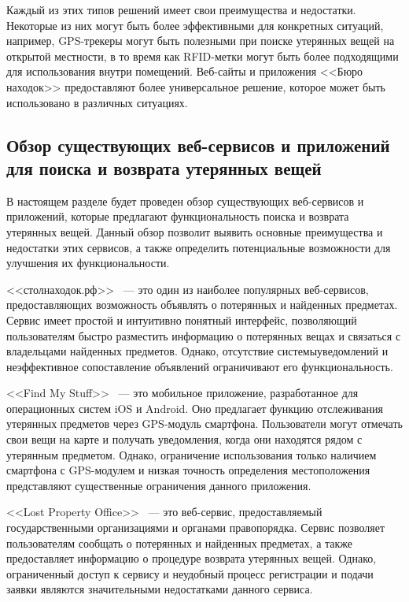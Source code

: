 \documentclass{mirea}
\begin{document}
Каждый из этих типов решений имеет свои преимущества и недостатки. Некоторые из них могут быть более эффективными для конкретных ситуаций, например, GPS-трекеры могут быть полезными при поиске утерянных вещей на открытой местности, в то время как RFID-метки могут быть более подходящими для использования внутри помещений. Веб-сайты и приложения <<Бюро находок>> предоставляют более универсальное решение, которое может быть использовано в различных ситуациях.

\subsection{Обзор существующих веб-сервисов и приложений для поиска и возврата утерянных вещей}

В настоящем разделе будет проведен обзор существующих веб-сервисов и приложений, которые предлагают функциональность поиска и возврата утерянных вещей. Данный обзор позволит выявить основные преимущества и недостатки этих сервисов, а также определить потенциальные возможности для улучшения их функциональности.

<<столнаходок.рф>>~\cite{bib:stol_nahodok} --- это один из наиболее популярных веб-сервисов, предоставляющих возможность объявлять о потерянных и найденных предметах. Сервис имеет простой и интуитивно понятный интерфейс, позволяющий пользователям быстро разместить информацию о потерянных вещах и связаться с владельцами найденных предметов. Однако, отсутствие системыуведомлений и неэффективное сопоставление объявлений ограничивают его функциональность.

<<Find My Stuff>>~\cite{bib:find_my_stuff} --- это мобильное приложение, разработанное для операционных систем iOS и Android. Оно предлагает функцию отслеживания утерянных предметов через GPS-модуль смартфона. Пользователи могут отмечать свои вещи на карте и получать уведомления, когда они находятся рядом с утерянным предметом. Однако, ограничение использования только наличием смартфона с GPS-модулем и низкая точность определения местоположения представляют существенные ограничения данного приложения.

<<Lost Property Office>>~\cite{bib:parliament_lost_and_found} --- это веб-сервис, предоставляемый государственными организациями и органами правопорядка. Сервис позволяет пользователям сообщать о потерянных и найденных предметах, а также предоставляет информацию о процедуре возврата утерянных вещей. Однако, ограниченный доступ к сервису и неудобный процесс регистрации и подачи заявки являются значительными недостатками данного сервиса.
\end{document}
